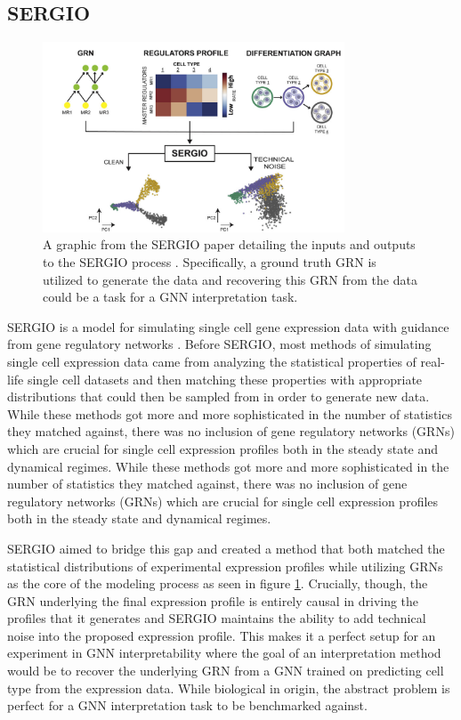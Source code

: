\subsection{SERGIO}
\label{sec:sergio}
\begin{figure}[h]
	\centering
	\includegraphics[width=0.8\textwidth]{images/sergio.png}
	\caption{A graphic from the SERGIO paper detailing the inputs and outputs to the SERGIO process \cite{dibaeinia_sergio_2020}. Specifically, a ground truth GRN is utilized to generate the data and recovering this GRN from the data could be a task for a GNN interpretation task.}
	\label{fig:sergio}
\end{figure}
SERGIO is a model for simulating single cell gene expression data with guidance from gene regulatory networks \cite{dibaeinia_sergio_2020}. Before SERGIO, most methods of simulating single cell expression data came from analyzing the statistical properties of real-life single cell datasets and then matching these properties with appropriate distributions that could then be sampled from in order to generate new data. While these methods got more and more sophisticated in the number of statistics they matched against, there was no inclusion of gene regulatory networks (GRNs) which are crucial for single cell expression profiles both in the steady state and dynamical regimes. While these methods got more and more sophisticated in the number of statistics they matched against, there was no inclusion of gene regulatory networks (GRNs) which are crucial for single cell expression profiles both in the steady state and dynamical regimes.

SERGIO aimed to bridge this gap and created a method that both matched the statistical distributions of experimental expression profiles while utilizing GRNs as the core of the modeling process as seen in figure \ref{fig:sergio}. Crucially, though, the GRN underlying the final expression profile is entirely causal in driving the profiles that it generates and SERGIO maintains the ability to add technical noise into the proposed expression profile. This makes it a perfect setup for an experiment in GNN interpretability where the goal of an interpretation method would be to recover the underlying GRN from a GNN trained on predicting cell type from the expression data. While biological in origin, the abstract problem is perfect for a GNN interpretation task to be benchmarked against.
\newpage

